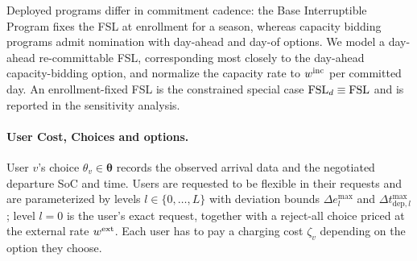 \begin{remark}\label{rem:program}
Deployed programs differ in commitment cadence: the Base Interruptible Program fixes the FSL at enrollment for a season, whereas capacity bidding programs admit nomination with day-ahead and day-of options. We model a day-ahead re-committable FSL, corresponding most closely to the day-ahead capacity-bidding option, and normalize the capacity rate to $w^{\mathrm{inc}}$ per committed day. An enrollment-fixed FSL is the constrained special case $\mathrm{FSL}_d \equiv \mathrm{FSL}$ and is reported in the sensitivity analysis.
\end{remark}


\paragraph{User Cost, Choices and options.} User $v$'s choice $\theta_v \in \boldsymbol{\theta}$ records the observed arrival data and the negotiated departure SoC and time. Users are requested to be flexible in their requests and are parameterized by levels $l \in \{0, \ldots, L\}$ with deviation bounds $\Delta e^{\max}_l$ and $\Delta t^{\max}_{\mathrm{dep},l}$; level $l = 0$ is the user's exact request, together with a reject-all choice priced at the external rate $w^{\mathrm{ext}}$. Each user has to pay a charging cost $\zeta_v$ depending on the option they choose. 


